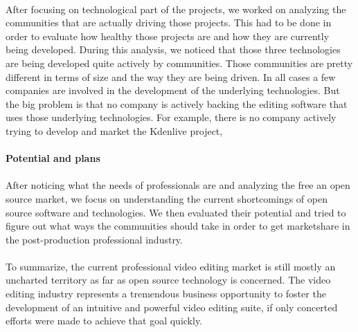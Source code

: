 \paragraph{}

After focusing on technological part of the projects, we worked on
analyzing the communities that are actually driving those projects. This
had to be done in order to evaluate how healthy those projects are and
how they are currently being developed. During this analysis, we noticed
that those three technologies are being developed quite actively by
communities. Those communities are pretty different in terms of size and
the way they are being driven. In all cases a few companies are involved
in the development of the underlying technologies. But the big problem
is that no company is actively backing the editing software that uses
those underlying technologies. For example, there is no company actively
trying to develop and market the Kdenlive project,

\paragraph{Potential and plans}

\paragraph{}

After noticing what the needs of professionals are and analyzing the free
an open source market, we focus on understanding the current shortcomings
of open source software and technologies.  We then evaluated their
potential and tried to figure out what ways the communities should take
in order to get marketshare in the post-production professional industry.

\paragraph{}

To summarize, the current professional video editing market is still
mostly an uncharted territory as far as open source technology is
concerned. The video editing industry represents a tremendous business
opportunity to foster the development of an intuitive and powerful
video editing suite, if only concerted efforts were made to achieve that
goal quickly.
